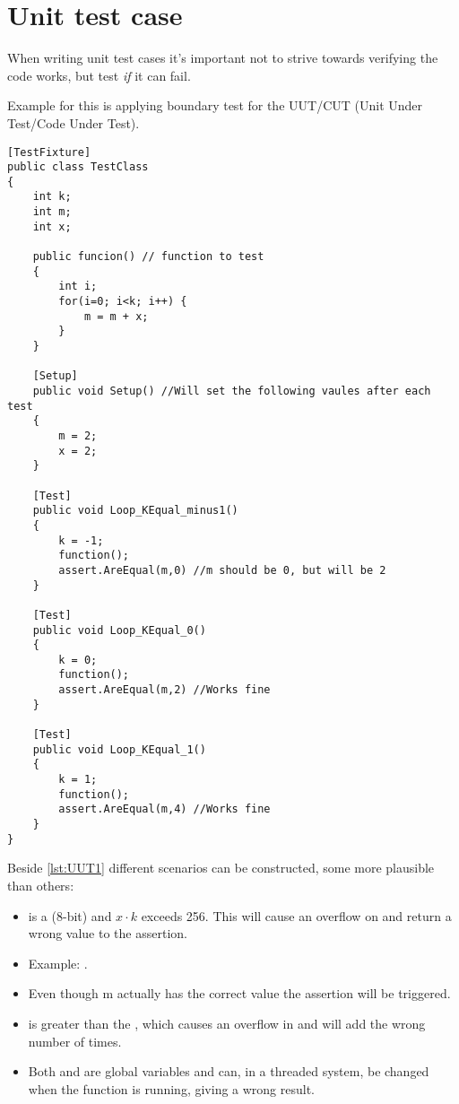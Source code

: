 \documentclass[Main_Assignment4]{subfiles}
\begin{document}
\section{Unit test case}
When writing unit test cases it's important not to strive towards verifying the code works, but test \emph{if} it can fail.

Example for this is applying boundary test for the UUT/CUT (Unit Under Test/Code Under Test). 

\begin{lstlisting}[caption=Unit tests -- different k-values, style=Code-C++, label=lst:UUT1]
[TestFixture]
public class TestClass
{
	int k;
	int m;
	int x;

	public funcion() // function to test
	{
		int i;
		for(i=0; i<k; i++) {
			m = m + x;
		}
	}

	[Setup]
	public void Setup() //Will set the following vaules after each test
	{
		m = 2;
		x = 2;
	}

	[Test]
	public void Loop_KEqual_minus1()
	{
		k = -1;
		function();
		assert.AreEqual(m,0) //m should be 0, but will be 2
	}

	[Test]
	public void Loop_KEqual_0()
	{
		k = 0;
		function();
		assert.AreEqual(m,2) //Works fine
	}

	[Test]
	public void Loop_KEqual_1()
	{
		k = 1;
		function();
		assert.AreEqual(m,4) //Works fine
	}
}
\end{lstlisting}

Beside \codeTitle \ref{lst:UUT1} different scenarios can be constructed, some more plausible than others:
\begin{itemize}
	\item {}  is a  (8-bit) and $x \cdot k$ exceeds 256. This will cause an overflow on  and return a wrong value to the assertion.
	\item[] Example: .
	\item[] Even though m actually has the correct value the assertion will be triggered.

	\item {} is greater than the , which causes an overflow in  and will add  the wrong number of times.

	\item Both  and  are global variables and can, in a threaded system, be changed when the function is running, giving a wrong result.
\end{itemize}
\end{document}
